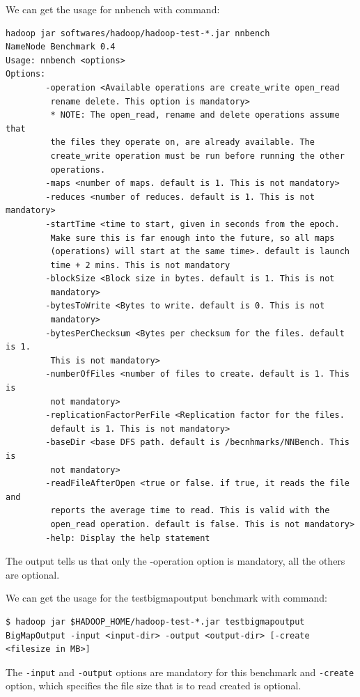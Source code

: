 We can get the usage for nnbench with command:
\lstset{style=bashstyle}
\begin{lstlisting}
hadoop jar softwares/hadoop/hadoop-test-*.jar nnbench
NameNode Benchmark 0.4
Usage: nnbench <options>
Options:
        -operation <Available operations are create_write open_read
         rename delete. This option is mandatory>
         * NOTE: The open_read, rename and delete operations assume that
         the files they operate on, are already available. The
         create_write operation must be run before running the other
         operations.
        -maps <number of maps. default is 1. This is not mandatory>
        -reduces <number of reduces. default is 1. This is not mandatory>
        -startTime <time to start, given in seconds from the epoch.
         Make sure this is far enough into the future, so all maps
         (operations) will start at the same time>. default is launch
         time + 2 mins. This is not mandatory
        -blockSize <Block size in bytes. default is 1. This is not
         mandatory>
        -bytesToWrite <Bytes to write. default is 0. This is not
         mandatory>
        -bytesPerChecksum <Bytes per checksum for the files. default is 1.
         This is not mandatory>
        -numberOfFiles <number of files to create. default is 1. This is
         not mandatory>
        -replicationFactorPerFile <Replication factor for the files.
         default is 1. This is not mandatory>
        -baseDir <base DFS path. default is /becnhmarks/NNBench. This is
         not mandatory>
        -readFileAfterOpen <true or false. if true, it reads the file and
         reports the average time to read. This is valid with the
         open_read operation. default is false. This is not mandatory>
        -help: Display the help statement
\end{lstlisting}

The output tells us that only the -operation option is mandatory, all the others are optional.

We can get the usage for the testbigmapoutput benchmark with command:
\lstset{style=bashstyle}
\begin{lstlisting}
$ hadoop jar $HADOOP_HOME/hadoop-test-*.jar testbigmapoutput
BigMapOutput -input <input-dir> -output <output-dir> [-create <filesize in MB>]
\end{lstlisting}
The \verb|-input| and \verb|-output| options are mandatory for this benchmark and \verb|-create| option, which specifies the file size that is to read created is optional.

